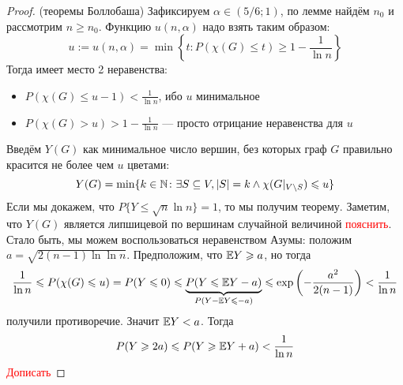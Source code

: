 \begin{proof} (теоремы Боллобаша)
	Зафиксируем $\alpha \in (5/6; 1)$, по лемме найдём $n_0$ и рассмотрим $n \ge n_0$. Функцию $u(n, \alpha)$ надо взять таким образом:
	\[
		u := u(n, \alpha) = \min \left\{t \colon P(\chi(G) \le t) \ge 1 - \frac{1}{\ln n}\right\}
	\]
	Тогда имеет место 2 неравенства:
	\begin{itemize}
		\item \(P(\chi(G) \le u - 1) < \frac{1}{\ln n}\), ибо $u$ минимальное
		
		\item \(P(\chi(G) > u) > 1 - \frac{1}{\ln n}\) --- просто отрицание неравенства для $u$
	\end{itemize}
	Введём $Y(G)$ как минимальное число вершин, без которых граф $G$ правильно красится не более чем $u$ цветами:
	\[
		Y(G) = \min \{k \in \mathbb{N} \colon \exists S \subseteq V, |S| = k \wedge \chi(G|_{V \backslash S}) \leqslant u\}
	\]
	Если мы докажем, что $P\{Y \le \sqrt{n}\ln n\} = 1$, то мы получим теорему. Заметим, что $Y(G)$ является липшицевой по вершинам случайной величиной \textcolor{red}{пояснить}. Стало быть, мы можем воспользоваться неравенством Азумы: положим $a = \sqrt{2(n - 1)\ln\ln n}$. Предположим, что $\mathbb{E} Y \geqslant a$, но тогда
	\[
		\frac{1}{\ln n} \leqslant P(\chi(G) \leqslant u) = P(Y \leqslant 0) \leqslant \underbrace{P(Y \leqslant \mathbb{E} Y - a)}_{P(Y - \mathbb{E} Y \leqslant -a)} \leqslant \exp\left(-\frac{a^2}{2(n - 1)}\right) < \frac{1}{\ln n}
	\]
	получили противоречие. Значит $\mathbb{E} Y < a$. Тогда
	\[
		P(Y \geqslant 2a) \leqslant P(Y \geqslant \mathbb{E} Y + a) < \frac{1}{\ln n}
	\]
	\textcolor{red}{Дописать}
\end{proof}
